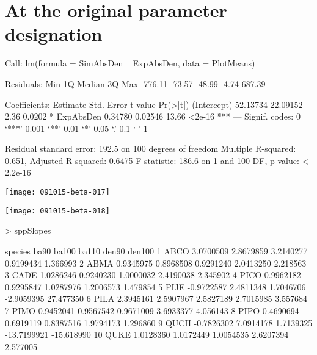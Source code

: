 \documentclass{article}
\begin{document}
\section{At the original parameter designation}
\begin{Schunk}
\begin{Soutput}
Call:
lm(formula = SimAbsDen ~ ExpAbsDen, data = PlotMeans)

Residuals:
    Min      1Q  Median      3Q     Max 
-776.11  -73.57  -48.99   -4.74  687.39 

Coefficients:
            Estimate Std. Error t value Pr(>|t|)    
(Intercept) 52.13734   22.09152    2.36   0.0202 *  
ExpAbsDen    0.34780    0.02546   13.66   <2e-16 ***
---
Signif. codes:  0 ‘***’ 0.001 ‘**’ 0.01 ‘*’ 0.05 ‘.’ 0.1 ‘ ’ 1

Residual standard error: 192.5 on 100 degrees of freedom
Multiple R-squared:  0.651,	Adjusted R-squared:  0.6475 
F-statistic: 186.6 on 1 and 100 DF,  p-value: < 2.2e-16
\end{Soutput}
\end{Schunk}
\texttt{[image: 091015-beta-017]}

\texttt{[image: 091015-beta-018]}
\begin{Schunk}
\begin{Sinput}
>   sppSlopes
\end{Sinput}
\begin{Soutput}
   species       ba90     ba100     ba110       den90     den100
1     ABCO  3.0700509 2.8679859 3.2140277   0.9199434   1.366993
2     ABMA  0.9345975 0.8968508 0.9291240   2.0413250   2.218563
3     CADE  1.0286246 0.9240230 1.0000032   2.4190038   2.345902
4     PICO  0.9962182 0.9295847 1.0287976   1.2006573   1.479854
5     PIJE -0.9722587 2.4811348 1.7046706  -2.9059395  27.477350
6     PILA  2.3945161 2.5907967 2.5827189   2.7015985   3.557684
7     PIMO  0.9452041 0.9567542 0.9671009   3.6933377   4.056143
8     PIPO  0.4690694 0.6919119 0.8387516   1.9794173   1.296860
9     QUCH -0.7826302 7.0914178 1.7139325 -13.7199921 -15.618990
10    QUKE  1.0128360 1.0172449 1.0054535   2.6207394   2.577005
\end{Soutput}
\end{Schunk}





\newpage
\end{document}
